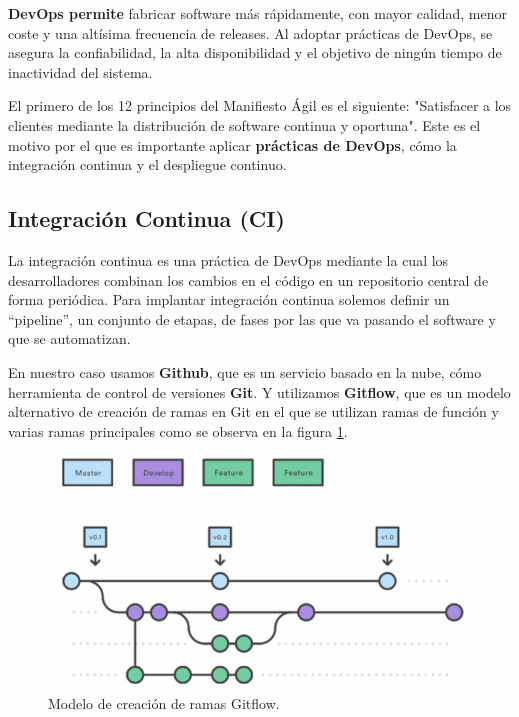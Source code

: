 \documentclass[12pt,twoside,titlepage]{report}
\begin{document}
\textbf{DevOps permite} fabricar software más rápidamente, con mayor calidad, menor coste y una altísima frecuencia de releases. Al adoptar prácticas de DevOps, se asegura la confiabilidad, la alta disponibilidad y el objetivo de ningún tiempo de inactividad del sistema.

El primero de los 12 principios del Manifiesto Ágil es el siguiente: "Satisfacer a los clientes mediante la distribución de software continua y oportuna". Este es el motivo por el que es importante aplicar \textbf{prácticas de DevOps}, cómo la integración continua y el despliegue continuo.

\subsection{Integración Continua (CI)}

La integración continua es una práctica de DevOps mediante la cual los desarrolladores combinan los cambios en el código en un repositorio central de forma periódica. Para implantar integración continua solemos definir un ``pipeline'', un conjunto de etapas, de fases por las que va pasando el software y que se automatizan. 

En nuestro caso usamos \textbf{Github}, que es un servicio basado en la nube, cómo herramienta de control de versiones \textbf{Git}. Y utilizamos \textbf{Gitflow}, que es un modelo alternativo de creación de ramas en Git en el que se utilizan ramas de función y varias ramas principales como se observa en la figura \ref{fig:Gitflow}.

\begin{figure}[H]
    \centering
    \includegraphics[scale=0.58]{DevOps/Gitflow}
    \caption{Modelo de creación de ramas Gitflow.}
    \label{fig:Gitflow}
\end{figure}
\end{document}

